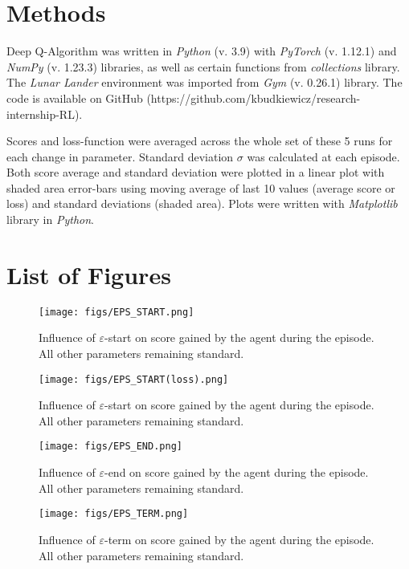 \documentclass{article}
\begin{document}
\section*{Methods}
Deep Q-Algorithm was written in \textit{Python} (v. 3.9) with \textit{PyTorch} (v. 1.12.1) and \textit{NumPy} (v. 1.23.3) libraries, as well as certain functions from \textit{collections} library. The \textit{Lunar Lander} environment was imported from \textit{Gym} (v. 0.26.1) library. The code is available on GitHub (https://github.com/kbudkiewicz/research-internship-RL).

Scores and loss-function were averaged across the whole set of these 5 runs for each change in parameter. Standard deviation $\sigma$ was calculated at each episode. Both score average and standard deviation were plotted in a linear plot with shaded area error-bars using moving average of last 10 values (average score or loss) and standard deviations (shaded area). Plots were written with \textit{Matplotlib} library in \textit{Python}.

\section*{List of Figures}

\begin{figure}[ht]
    \centering
    \texttt{[image: figs/EPS\_START.png]}
    \caption{Influence of $\varepsilon$-start on score gained by the agent during the episode. All other parameters remaining standard.}
    \label{fig:start}
\end{figure}

\begin{figure}
    \centering
    \texttt{[image: figs/EPS\_START(loss).png]}
    \caption{Influence of $\varepsilon$-start on score gained by the agent during the episode. All other parameters remaining standard.}
    \label{fig:start_loss}
\end{figure}

\begin{figure}
    \centering
    \texttt{[image: figs/EPS\_END.png]}
    \caption{Influence of $\varepsilon$-end on score gained by the agent during the episode. All other parameters remaining standard.}
    \label{fig:end}
\end{figure}

\begin{figure}
    \centering
    \texttt{[image: figs/EPS\_TERM.png]}
    \caption{Influence of $\varepsilon$-term on score gained by the agent during the episode. All other parameters remaining standard.}
    \label{fig:term}
\end{figure}
\end{document}
